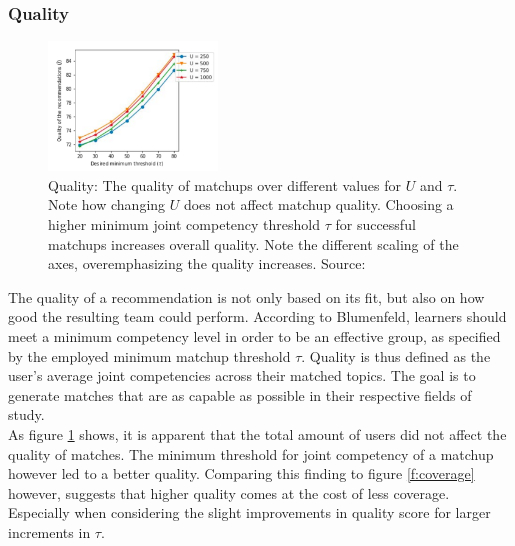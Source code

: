 \documentclass[conference]{IEEEtran}
\begin{document}
\subsubsection{Quality} \label{paper:quality}
\begin{figure}[!t]
	\centering
	\includegraphics[width=0.4\textwidth]{g/QualityByU.PNG}
	\caption{Quality: The quality of matchups over different values for \(U\) and \(\tau\). Note how changing \(U\) does not affect matchup quality. Choosing a higher minimum joint competency threshold \(\tau\) for successful matchups increases overall quality. Note the different scaling of the axes, overemphasizing the quality increases. Source: \cite{potts2018reciprocal}}
	\label{f:quality}
\end{figure}
The quality of a recommendation is not only based on its fit, but also on how good the resulting team could perform. According to Blumenfeld, learners should meet a minimum competency level in order to be an effective group, as specified by the employed minimum matchup threshold \(\tau\). \cite{blumenfeld1996learning} Quality is thus defined as the user's average joint competencies across their matched topics. The goal is to generate matches that are as capable as possible in their respective fields of study.\\
As figure \ref{f:quality} shows, it is apparent that the total amount of users did not affect the quality of matches. The minimum threshold for joint competency of a matchup however led to a better quality. Comparing this finding to figure \ref{f:coverage} however, suggests that higher quality comes at the cost of less coverage. Especially when considering the slight improvements in quality score for larger increments in \(\tau\).\\
\end{document}
